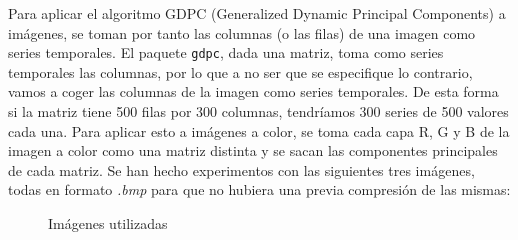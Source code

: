 Para aplicar el algoritmo GDPC (Generalized Dynamic Principal Components) a imágenes, se toman por tanto las columnas (o las filas) de una imagen como series temporales. El paquete \texttt{gdpc}, dada una matriz, toma como series temporales las columnas, por lo que a no ser que se especifique lo contrario, vamos a coger las columnas de la imagen como series temporales. De esta forma si la matriz tiene 500 filas por 300 columnas, tendríamos 300 series de 500 valores cada una. Para aplicar esto a imágenes a color, se toma cada capa R, G y B de la imagen a color como una matriz distinta y se sacan las componentes principales de cada matriz. Se han hecho experimentos con las siguientes tres imágenes, todas en formato \textit{.bmp} para que no hubiera una previa compresión de las mismas:
\begin{figure}[H]
 \centering
 \caption{Imágenes utilizadas}
 \label{f:imgs}
\end{figure}

